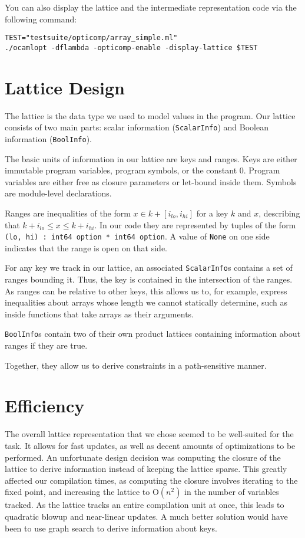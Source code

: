 \documentclass[11pt]{article}
\begin{document}
You can also display the lattice and the intermediate representation code via the following command:

\begin{verbatim}
TEST="testsuite/opticomp/array_simple.ml"
./ocamlopt -dflambda -opticomp-enable -display-lattice $TEST
\end{verbatim}

\section{Lattice Design}

The lattice is the data type we used to model values in the program.
Our lattice consists of two main parts: scalar information (\verb|ScalarInfo|) and Boolean information (\verb|BoolInfo|).

The basic units of information in our lattice are keys and ranges. Keys are either immutable program variables, program symbols, or the constant 0. Program variables are either free as closure parameters or let-bound inside them.
Symbols are module-level declarations.

Ranges are inequalities of the form
$x \in k + [i_{\mathit{lo}}, i_{\mathit{hi}}]$ for a key $k$ and $x$, describing that
$k + i_{\mathit{lo}} \le x \le k + i_{\mathit{hi}}$.
In our code they are represented by tuples of the form \verb|(lo, hi) : int64 option * int64 option|.
A value of \verb|None| on one side indicates that the range is open on that side.

For any key we track in our lattice, an associated \verb|ScalarInfo|s contains a set of ranges bounding it.
Thus, the key is contained in the intersection of the ranges. As ranges can be relative to other keys, this allows us to, for example, express inequalities about arrays whose length we cannot statically determine, such as inside functions that take arrays as their arguments.

\verb|BoolInfo|s contain two of their own product lattices containing information about ranges if they are true.

Together, they allow us to derive constraints in a path-sensitive manner.
\section{Efficiency}

The overall lattice representation that we chose seemed to be well-suited for the task. It allows for fast updates, as well as decent amounts of optimizations to be performed.
An unfortunate design decision was computing the closure of the lattice to derive information instead of keeping the lattice sparse. This greatly affected our compilation times, as computing the closure involves iterating to the fixed point, and increasing the lattice to $\mathrm{O}(n^2)$ in the number of variables tracked. As the lattice tracks an entire compilation unit at once, this leads to quadratic blowup and near-linear updates. A much better solution would have been to use graph search to derive information about keys.
\end{document}
